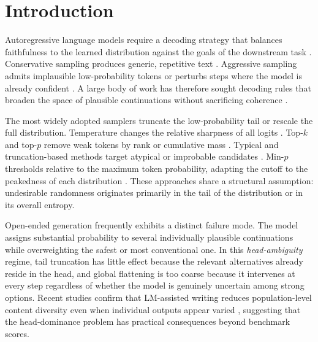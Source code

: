 \documentclass{article}
\begin{document}
\section{Introduction}

Autoregressive language models \citep{bengio2003neural, vaswani2017attention, brown2020language} require a decoding strategy that balances faithfulness to the learned distribution against the goals of the downstream task \citep{wiher2022decoding, celikyilmaz2020evaluation}.
Conservative sampling produces generic, repetitive text \citep{holtzman2020curious}.
Aggressive sampling admits implausible low-probability tokens or perturbs steps where the model is already confident \citep{hewitt2022truncation, renze2024effect}.
A large body of work has therefore sought decoding rules that broaden the space of plausible continuations without sacrificing coherence \citep{fan2018hierarchical, holtzman2020curious, meister2023typical, basu2021mirostat}.

The most widely adopted samplers truncate the low-probability tail or rescale the full distribution.
Temperature changes the relative sharpness of all logits \citep{ackley1985learning}.
Top-$k$ and top-$p$ remove weak tokens by rank or cumulative mass \citep{fan2018hierarchical, holtzman2020curious}.
Typical and truncation-based methods target atypical or improbable candidates \citep{meister2023typical, hewitt2022truncation}.
Min-$p$ thresholds relative to the maximum token probability, adapting the cutoff to the peakedness of each distribution \citep{ICLR2025_afa5f124}.
These approaches share a structural assumption: undesirable randomness originates primarily in the tail of the distribution or in its overall entropy.

Open-ended generation frequently exhibits a distinct failure mode.
The model assigns substantial probability to several individually plausible continuations while overweighting the safest or most conventional one.
In this \emph{head-ambiguity} regime, tail truncation has little effect because the relevant alternatives already reside in the head, and global flattening is too coarse because it intervenes at every step regardless of whether the model is genuinely uncertain among strong options.
Recent studies confirm that LM-assisted writing reduces population-level content diversity even when individual outputs appear varied \citep{padmakumar2024contentdiversity, doshi2024generative, anderson2024homogenization}, suggesting that the head-dominance problem has practical consequences beyond benchmark scores.
\end{document}

